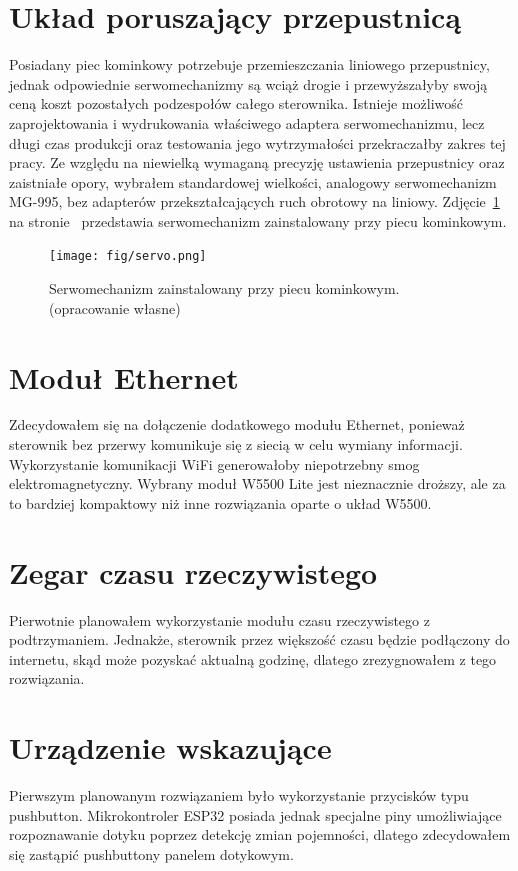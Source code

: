 \documentclass[11pt]{report}
\begin{document}
 \section{Układ poruszający przepustnicą} 
 Posiadany piec kominkowy potrzebuje przemieszczania liniowego przepustnicy, jednak odpowiednie serwomechanizmy są wciąż drogie i przewyższałyby swoją ceną koszt pozostałych podzespołów całego sterownika.
 Istnieje możliwość zaprojektowania i wydrukowania właściwego adaptera serwomechanizmu, lecz długi czas produkcji oraz testowania jego wytrzymałości przekraczałby zakres tej pracy.
  Ze względu na niewielką wymaganą precyzję ustawienia przepustnicy oraz zaistniałe opory, wybrałem standardowej wielkości, analogowy serwomechanizm MG-995, bez adapterów przekształcających ruch obrotowy na liniowy.
   Zdjęcie~\ref{fig:servo} na stronie~\pageref{fig:servo} przedstawia serwomechanizm zainstalowany przy piecu kominkowym.
    \begin{figure}[ht]
\centering
\texttt{[image: fig/servo.png]}
\caption{Serwomechanizm zainstalowany przy piecu kominkowym. (opracowanie własne)}
\label{fig:servo}
\end{figure}
 
 \section{Moduł Ethernet}
 Zdecydowałem się na dołączenie dodatkowego modułu Ethernet, ponieważ sterownik bez przerwy komunikuje się z siecią w celu wymiany informacji. Wykorzystanie komunikacji WiFi generowałoby niepotrzebny smog elektromagnetyczny. Wybrany moduł W5500 Lite jest nieznacznie droższy, ale za to bardziej kompaktowy niż inne rozwiązania oparte o układ W5500.
 
 \section{Zegar czasu rzeczywistego}
 Pierwotnie planowałem wykorzystanie modułu czasu rzeczywistego z podtrzymaniem. Jednakże, sterownik przez większość czasu będzie podłączony do internetu, skąd może pozyskać aktualną godzinę, dlatego zrezygnowałem z tego rozwiązania.
 
 \section{Urządzenie wskazujące}
 Pierwszym planowanym rozwiązaniem było wykorzystanie przycisków typu pushbutton. Mikrokontroler ESP32 posiada jednak specjalne piny umożliwiające rozpoznawanie dotyku poprzez detekcję zmian pojemności, dlatego zdecydowałem się zastąpić pushbuttony panelem dotykowym.
 
\end{document}
